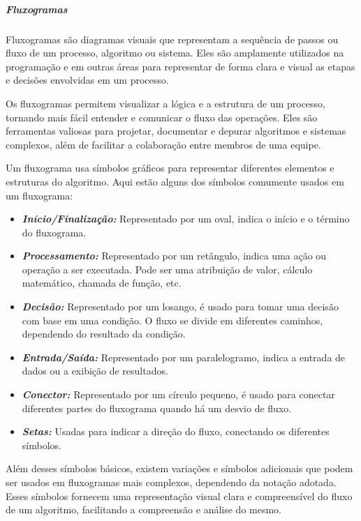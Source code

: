 \documentclass[a4paper, 12pt, onecolumn,singlespacing]{article}
\begin{document}
	\subparagraph{Fluxogramas}
	Fluxogramas são diagramas visuais que representam a sequência de passos ou fluxo de um processo, algoritmo ou sistema. Eles são amplamente utilizados na programação e em outras áreas para representar de forma clara e visual as etapas e decisões envolvidas em um processo.
	
	Os fluxogramas permitem visualizar a lógica e a estrutura de um processo, tornando mais fácil entender e comunicar o fluxo das operações. Eles são ferramentas valiosas para projetar, documentar e depurar algoritmos e sistemas complexos, além de facilitar a colaboração entre membros de uma equipe.
	
	Um fluxograma usa símbolos gráficos para representar diferentes elementos e estruturas do algoritmo. Aqui estão alguns dos símbolos comumente usados em um fluxograma:
	
	\begin{itemize}
		\item \textbf{\textit{Início/Finalização:}} Representado por um oval, indica o início e o término do fluxograma.
		
		\item \textbf{\textit{Processamento:}} Representado por um retângulo, indica uma ação ou operação a ser executada. Pode ser uma atribuição de valor, cálculo matemático, chamada de função, etc.
		
		\item \textbf{\textit{Decisão:}} Representado por um losango, é usado para tomar uma decisão com base em uma condição. O fluxo se divide em diferentes caminhos, dependendo do resultado da condição.
		
		\item \textbf{\textit{Entrada/Saída:}} Representado por um paralelogramo, indica a entrada de dados ou a exibição de resultados.
		
		\item \textbf{\textit{Conector:}} Representado por um círculo pequeno, é usado para conectar diferentes partes do fluxograma quando há um desvio de fluxo.
		
		\item \textbf{\textit{Setas:}} Usadas para indicar a direção do fluxo, conectando os diferentes símbolos.
		
	\end{itemize}
	
	Além desses símbolos básicos, existem variações e símbolos adicionais que podem ser usados em fluxogramas mais complexos, dependendo da notação adotada. Esses símbolos fornecem uma representação visual clara e compreensível do fluxo de um algoritmo, facilitando a compreensão e análise do mesmo.
	
\end{document}
